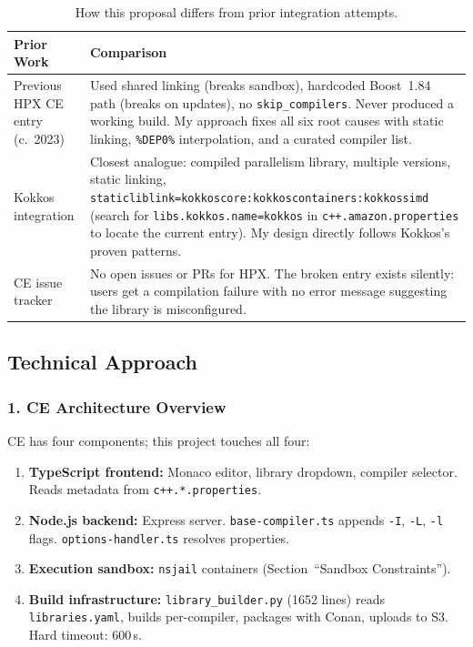 \documentclass[11pt, a4paper]{article}
\newcommand{\code}[1]{\texttt{#1}}
\newcommand{\cefile}[1]{\texttt{#1}}
\begin{document}
\begin{table}[H]
\centering\small
\begin{tabularx}{\linewidth}{@{}lX@{}}
\toprule
\textbf{Prior Work} & \textbf{Comparison} \\
\midrule
\rowcolor{rowgray}
Previous HPX CE entry (c.~2023) &
  Used shared linking (breaks sandbox), hardcoded Boost~1.84 path
  (breaks on updates), no \code{skip\_compilers}.  Never produced a
  working build.  My approach fixes all six root causes with static
  linking, \code{\%DEP0\%} interpolation, and a curated compiler list. \\
Kokkos integration &
  Closest analogue: compiled parallelism library, multiple versions, static
  linking, \code{staticliblink=kokkoscore:kokkoscontainers:kokkossimd}
  (search for \code{libs.kokkos.name=kokkos} in
  \cefile{c++.amazon.properties} to locate the current entry).  My design directly
  follows Kokkos's proven patterns. \\
\rowcolor{rowgray}
CE issue tracker &
  No open issues or PRs for HPX.  The broken entry exists silently:
  users get a compilation failure with no error message suggesting the
  library is misconfigured. \\
\bottomrule
\end{tabularx}
\caption{How this proposal differs from prior integration attempts.}
\end{table}

\subsection*{Technical Approach}

\subsubsection*{1. CE Architecture Overview}

CE has four components; this project touches all four:

\begin{enumerate}[leftmargin=2em, itemsep=2pt]
  \item \textbf{TypeScript frontend:} Monaco editor, library dropdown,
        compiler selector.  Reads metadata from \cefile{c++.*.properties}.
  \item \textbf{Node.js backend:} Express server.
        \cefile{base-compiler.ts} appends \code{-I}, \code{-L}, \code{-l}
        flags.  \cefile{options-handler.ts} resolves properties.
  \item \textbf{Execution sandbox:} \code{nsjail} containers (Section~``Sandbox
        Constraints'').
  \item \textbf{Build infrastructure:} \cefile{library\_builder.py} (1652 lines)
        reads \code{libraries.yaml}, builds per-compiler, packages with Conan,
        uploads to S3.  Hard timeout: 600\,s.
\end{enumerate}
\end{document}
